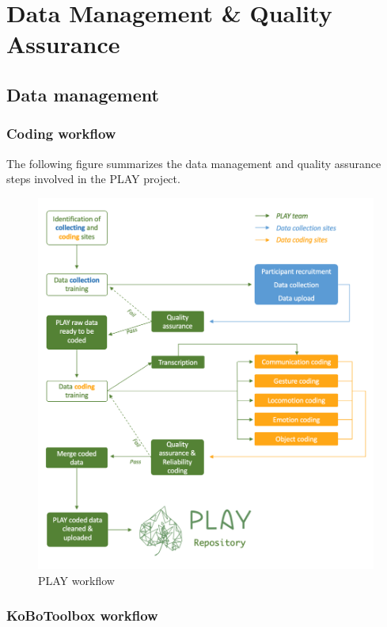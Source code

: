 \documentclass[
  12pt,
]{book}
\begin{document}
\hypertarget{part-data-management-quality-assurance}{%
\part*{Data Management \& Quality Assurance}\label{part-data-management-quality-assurance}}

\hypertarget{data-management}{%
\chapter{Data management}\label{data-management}}

\hypertarget{coding-workflow}{%
\section{Coding workflow}\label{coding-workflow}}

The following figure summarizes the data management and quality assurance steps involved in the PLAY project.

\begin{figure}

{\centering \includegraphics[width=0.7\linewidth]{img/overview-project} 

}

\caption{PLAY workflow}\label{fig:unnamed-chunk-2}
\end{figure}

\hypertarget{kobotoolbox-workflow}{%
\section{KoBoToolbox workflow}\label{kobotoolbox-workflow}}
\end{document}
